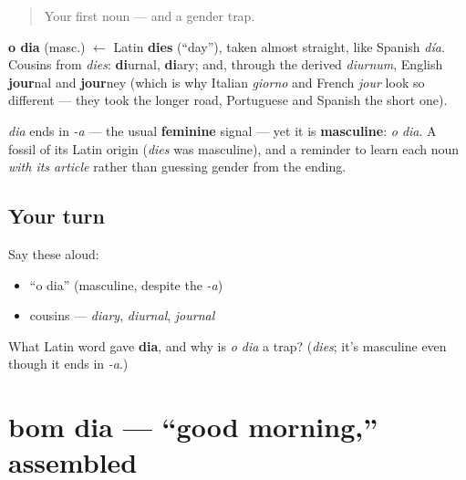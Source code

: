 \label{lesson:PT-C01-dia}



\begin{quote}
Your first noun — and a gender trap.
\end{quote}

\begin{cousinweb}
\textbf{o dia} (masc.) $\leftarrow$ Latin \textbf{dies} (\textquotedblleft{}day\textquotedblright{}), taken almost straight, like Spanish \emph{día}. Cousins from \emph{dies}: \textbf{di}urnal, \textbf{di}ary; and, through the derived \emph{diurnum}, English \textbf{jour}nal and \textbf{jour}ney (which is why Italian \emph{giorno} and French \emph{jour} look so different — they took the longer road, Portuguese and Spanish the short one).
\end{cousinweb}

\begin{grammarlens}[title={Grammar Lens: a gender trap}]
\emph{dia} ends in \emph{-a} — the usual \textbf{feminine} signal — yet it is \textbf{masculine}: \emph{o dia}. A fossil of its Latin origin (\emph{dies} was masculine), and a reminder to learn each noun \emph{with its article} rather than guessing gender from the ending.
\end{grammarlens}

\subsection*{Your turn}
Say these aloud:

\begin{itemize}
\raggedright
  \item \textquotedblleft{}o dia\textquotedblright{} (masculine, despite the \emph{-a})
  \item cousins — \emph{diary}, \emph{diurnal}, \emph{journal}
\end{itemize}

\begin{tcolorbox}[breakable,colback=teal!4,colframe=teal!35!black,title={Before you move on}]
What Latin word gave \textbf{dia}, and why is \emph{o dia} a trap? (\emph{dies}; it's masculine even though it ends in \emph{-a}.)
\end{tcolorbox}
\section[bom dia]{bom dia — \textquotedblleft{}good morning,\textquotedblright{} assembled}


